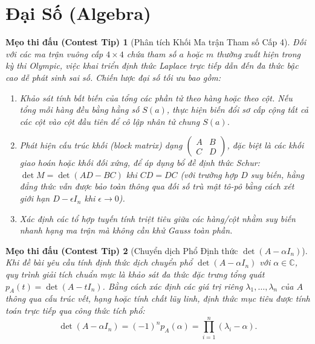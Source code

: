 \documentclass{article}
\newtheorem{tip}{Mẹo thi đấu (Contest Tip)}
\begin{document}


\section{Đại Số (Algebra)}

\begin{tip}[Phân tích Khối Ma trận Tham số Cấp 4]
Đối với các ma trận vuông cấp $4 \times 4$ chứa tham số $a$ hoặc $m$ thường xuất hiện trong kỳ thi Olympic, việc khai triển định thức Laplace trực tiếp dẫn đến đa thức bậc cao dễ phát sinh sai số. Chiến lược đại số tối ưu bao gồm:
\begin{enumerate}
    \item Khảo sát tính bất biến của tổng các phần tử theo hàng hoặc theo cột. Nếu tổng mỗi hàng đều bằng hằng số $S(a)$, thực hiện biến đổi sơ cấp cộng tất cả các cột vào cột đầu tiên để cô lập nhân tử chung $S(a)$.
    \item Phát hiện cấu trúc khối (block matrix) dạng $\begin{pmatrix} A & B \\ C & D \end{pmatrix}$, đặc biệt là các khối giao hoán hoặc khối đối xứng, để áp dụng bổ đề định thức Schur: $\det M = \det(AD - BC)$ khi $CD = DC$ (với trường hợp $D$ suy biến, hằng đẳng thức vẫn được bảo toàn thông qua đối số trù mật tô-pô bằng cách xét giới hạn $D - \epsilon I_n$ khi $\epsilon \to 0$).
    \item Xác định các tổ hợp tuyến tính triệt tiêu giữa các hàng/cột nhằm suy biến nhanh hạng ma trận mà không cần khử Gauss toàn phần.
\end{enumerate}
\end{tip}

\begin{tip}[Chuyển dịch Phổ Định thức $\det(A - \alpha I_n)$]
Khi đề bài yêu cầu tính định thức dịch chuyển phổ $\det(A - \alpha I_n)$ với $\alpha \in \mathbb{C}$, quy trình giải tích chuẩn mực là khảo sát đa thức đặc trưng tổng quát $p_A(t) = \det(A - t I_n)$. Bằng cách xác định các giá trị riêng $\lambda_1, \dots, \lambda_n$ của $A$ thông qua cấu trúc vết, hạng hoặc tính chất lũy linh, định thức mục tiêu được tính toán trực tiếp qua công thức tích phổ:
\begin{equation}
    \det(A - \alpha I_n) = (-1)^n p_A(\alpha) = \prod_{i=1}^n (\lambda_i - \alpha).
\end{equation}
\end{tip}
\end{document}
